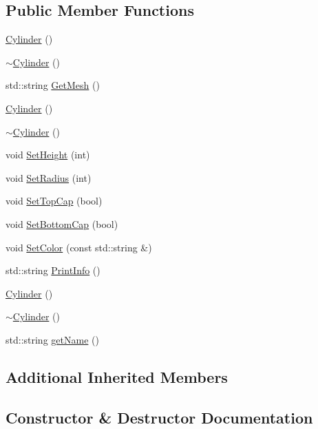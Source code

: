 \subsection*{Public Member Functions}
\begin{DoxyCompactItemize}
\item 
\mbox{\hyperlink{class_cylinder_a01dc978cb576f834b9545e43d4dad2a2}{Cylinder}} ()
\item 
\mbox{\hyperlink{class_cylinder_a05ab556f0ae3cd6e99d9d1f3caca80b3}{$\sim$\+Cylinder}} ()
\item 
std\+::string \mbox{\hyperlink{class_cylinder_adada3adc010fbd6530969b3f7845c727}{Get\+Mesh}} ()
\item 
\mbox{\hyperlink{class_cylinder_a01dc978cb576f834b9545e43d4dad2a2}{Cylinder}} ()
\item 
\mbox{\hyperlink{class_cylinder_a05ab556f0ae3cd6e99d9d1f3caca80b3}{$\sim$\+Cylinder}} ()
\item 
void \mbox{\hyperlink{class_cylinder_a269bbf0d359b586a9f0bd214e26109f4}{Set\+Height}} (int)
\item 
void \mbox{\hyperlink{class_cylinder_a6154587e13ab550cf3542188231957c5}{Set\+Radius}} (int)
\item 
void \mbox{\hyperlink{class_cylinder_a7c0f84cbfad4dda30a663a48858c70ea}{Set\+Top\+Cap}} (bool)
\item 
void \mbox{\hyperlink{class_cylinder_aacc8158ba918eed167fbfd43eadfe1b0}{Set\+Bottom\+Cap}} (bool)
\item 
void \mbox{\hyperlink{class_cylinder_a314d27ef3a15767f8c4ff538827c9a4a}{Set\+Color}} (const std\+::string \&)
\item 
std\+::string \mbox{\hyperlink{class_cylinder_ac61439519f076123be2ec3550ad34971}{Print\+Info}} ()
\item 
\mbox{\hyperlink{class_cylinder_a01dc978cb576f834b9545e43d4dad2a2}{Cylinder}} ()
\item 
\mbox{\hyperlink{class_cylinder_a05ab556f0ae3cd6e99d9d1f3caca80b3}{$\sim$\+Cylinder}} ()
\item 
std\+::string \mbox{\hyperlink{class_cylinder_afdb7f76b3f02471d638c36127395d181}{get\+Name}} ()
\end{DoxyCompactItemize}
\subsection*{Additional Inherited Members}


\subsection{Constructor \& Destructor Documentation}
\mbox{\label{class_cylinder_a01dc978cb576f834b9545e43d4dad2a2}} 
